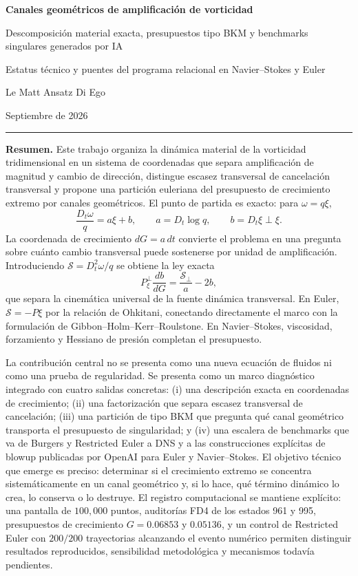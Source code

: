 \documentclass[11pt]{article}
\newcommand{\Dt}{D_t}
\newcommand{\Pperp}{P_{\xi}^{\perp}}
\newcommand{\Scal}{\mathcal S}
\begin{document}
\begin{center}
{\LARGE\bfseries\sffamily Canales geométricos de amplificación de vorticidad}\par
\vspace{0.35em}
{\Large\sffamily Descomposición material exacta, presupuestos tipo BKM y benchmarks singulares generados por IA}\par
\vspace{0.65em}
{\normalsize\sffamily Estatus técnico y puentes del programa relacional en Navier--Stokes y Euler}\par
\vspace{1em}
{\large Le Matt Ansatz Di Ego}\par
{\small Septiembre de 2026}\par
\end{center}

\vspace{0.55em}\hrule\vspace{0.8em}

\textbf{Resumen.} Este trabajo organiza la dinámica material de la vorticidad tridimensional en un sistema de coordenadas que separa amplificación de magnitud y cambio de dirección, distingue escasez transversal de cancelación transversal y propone una partición euleriana del presupuesto de crecimiento extremo por canales geométricos. El punto de partida es exacto: para $\omega=q\xi$,
\[
\frac{\Dt\omega}{q}=a\xi+b,\qquad a=\Dt\log q,\qquad b=\Dt\xi\perp\xi.
\]
La coordenada de crecimiento $dG=a\,dt$ convierte el problema en una pregunta sobre cuánto cambio transversal puede sostenerse por unidad de amplificación. Introduciendo $\Scal=\Dt^2\omega/q$ se obtiene la ley exacta
\[
\boxed{\Pperp\frac{db}{dG}=\frac{\Scal_\perp}{a}-2b},
\]
que separa la cinemática universal de la fuente dinámica transversal. En Euler, $\Scal=-P\xi$ por la relación de Ohkitani, conectando directamente el marco con la formulación de Gibbon--Holm--Kerr--Roulstone. En Navier--Stokes, viscosidad, forzamiento y Hessiano de presión completan el presupuesto.

La contribución central no se presenta como una nueva ecuación de fluidos ni como una prueba de regularidad. Se presenta como un marco diagnóstico integrado con cuatro salidas concretas: (i) una descripción exacta en coordenadas de crecimiento; (ii) una factorización que separa escasez transversal de cancelación; (iii) una partición de tipo BKM que pregunta qué canal geométrico transporta el presupuesto de singularidad; y (iv) una escalera de benchmarks que va de Burgers y Restricted Euler a DNS y a las construcciones explícitas de blowup publicadas por OpenAI para Euler y Navier--Stokes. El objetivo técnico que emerge es preciso: determinar si el crecimiento extremo se concentra sistemáticamente en un canal geométrico y, si lo hace, qué término dinámico lo crea, lo conserva o lo destruye. El registro computacional se mantiene explícito: una pantalla de $100{,}000$ puntos, auditorías FD4 de los estados 961 y 995, presupuestos de crecimiento $G=0.06853$ y $0.05136$, y un control de Restricted Euler con $200/200$ trayectorias alcanzando el evento numérico permiten distinguir resultados reproducidos, sensibilidad metodológica y mecanismos todavía pendientes.
\end{document}
